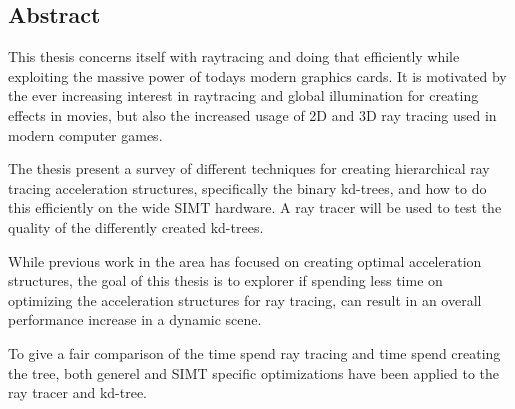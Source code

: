 

\begin{center}
\begin{minipage}{0.7\textwidth}
\section*{Abstract}

This thesis concerns itself with raytracing and doing that efficiently
while exploiting the massive power of todays modern graphics cards. It
is motivated by the ever increasing interest in raytracing and global
illumination for creating effects in movies, but also the increased
usage of 2D and 3D ray tracing used in modern computer games.

The thesis present a survey of different techniques for creating
hierarchical ray tracing acceleration structures, specifically the
binary kd-trees, and how to do this efficiently on the wide SIMT
hardware. A ray tracer will be used to test the quality of the
differently created kd-trees.

While previous work in the area has focused on creating optimal
acceleration structures, the goal of this thesis is to explorer if
spending less time on optimizing the acceleration structures for ray
tracing, can result in an overall performance increase in a dynamic
scene.

To give a fair comparison of the time spend ray tracing and time spend
creating the tree, both generel and SIMT specific optimizations have
been applied to the ray tracer and kd-tree.

\end{minipage}
\end{center}










